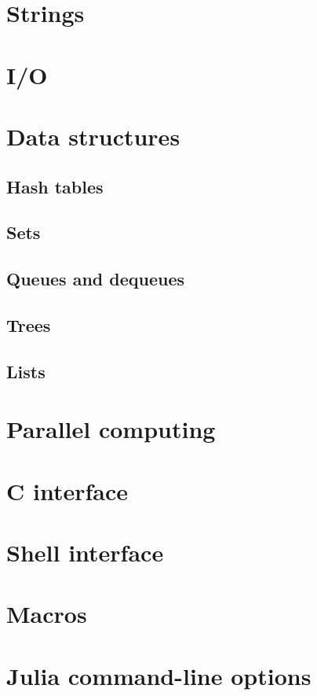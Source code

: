 \documentclass{article}
\begin{document}
\section{Strings}
\section{I/O}
\section{Data structures}
\subsection{Hash tables}
\subsection{Sets}
\subsection{Queues and dequeues}
\subsection{Trees}
\subsection{Lists}
\section{Parallel computing}
\section{C interface}
\section{Shell interface}
\section{Macros}
\section{Julia command-line options}
\end{document}
